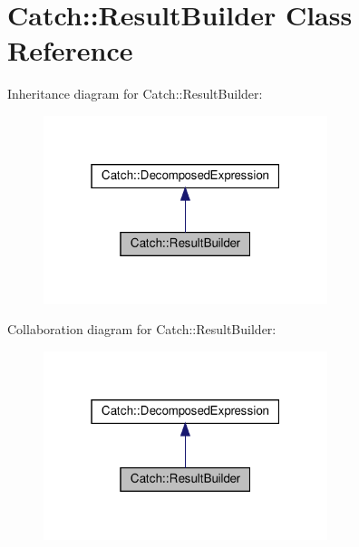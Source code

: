 \hypertarget{classCatch_1_1ResultBuilder}{}\section{Catch\+:\+:Result\+Builder Class Reference}
\label{classCatch_1_1ResultBuilder}


Inheritance diagram for Catch\+:\+:Result\+Builder\+:
\nopagebreak
\begin{figure}[H]
\begin{center}
\leavevmode
\includegraphics[width=235pt]{classCatch_1_1ResultBuilder__inherit__graph}
\end{center}
\end{figure}


Collaboration diagram for Catch\+:\+:Result\+Builder\+:
\nopagebreak
\begin{figure}[H]
\begin{center}
\leavevmode
\includegraphics[width=235pt]{classCatch_1_1ResultBuilder__coll__graph}
\end{center}
\end{figure}
